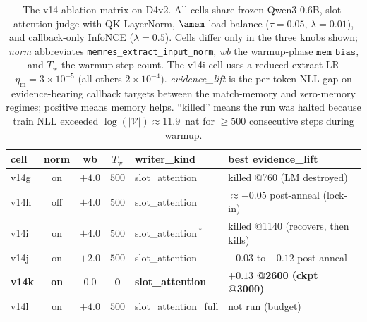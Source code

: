 \begin{table}[t]
\centering
\caption{The v14 ablation matrix on D4v2. All cells share frozen
Qwen3-0.6B, slot-attention judge with QK-LayerNorm, $\amem$
load-balance ($\tau{=}0.05$, $\lambda{=}0.01$), and callback-only
InfoNCE ($\lambda{=}0.5$). Cells differ only in the three knobs
shown; \emph{norm} abbreviates
\texttt{memres\_extract\_input\_norm}, \emph{wb} the warmup-phase
$\texttt{mem\_bias}$, and $T_{\text{w}}$ the warmup step count.
The v14i cell uses a reduced extract LR
$\eta_{\text{m}}{=}3{\times}10^{-5}$ (all others
$2{\times}10^{-4}$). \emph{evidence\_lift} is the per-token NLL
gap on evidence-bearing callback targets between the match-memory
and zero-memory regimes; positive means memory helps. ``killed''
means the run was halted because train NLL exceeded
$\log(|\mathcal{V}|) \approx 11.9$~nat for $\ge 500$ consecutive
steps during warmup.}
\label{tab:v14_grid}
\small
\begin{tabular}{lcccll}
\toprule
cell & norm & wb & $T_{\text{w}}$ & writer\_kind & best evidence\_lift \\
\midrule
v14g & on  & $+4.0$ & $500$ & slot\_attention      & killed @760 (LM destroyed) \\
v14h & off & $+4.0$ & $500$ & slot\_attention      & $\approx -0.05$ post-anneal (lock-in) \\
v14i & on  & $+4.0$ & $500$ & slot\_attention\,$^*$ & killed @1140 (recovers, then kills) \\
v14j & on  & $+2.0$ & $500$ & slot\_attention      & $-0.03$ to $-0.12$ post-anneal \\
\textbf{v14k} & \textbf{on}  & $\mathbf{0.0}$ & $\mathbf{0}$ & \textbf{slot\_attention} & $\boldsymbol{+0.13}$ \textbf{@2600 (ckpt @3000)} \\
v14l & on  & $+4.0$ & $500$ & slot\_attention\_full & not run (budget) \\
\bottomrule
\end{tabular}
\end{table}

